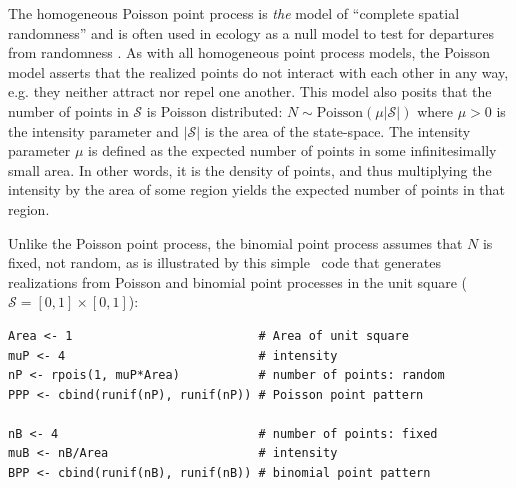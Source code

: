 The homogeneous Poisson point process is \textit{the} model of ``complete
spatial randomness'' and is often used in ecology as a null model
to test for departures from randomness
\citep{cressie:1992, diggle:2003, illian_etal:2008}.
As with all homogeneous point process models, the Poisson model
asserts that the realized points do not interact with each other in
any way, e.g. they neither attract nor repel one another.
This model also posits that the number of points in $\mathcal{S}$ is
Poisson distributed: $N \sim \text{Poisson}(\mu|\mathcal{S}|)$ where $\mu>0$ is
the intensity parameter and $|\mathcal{S}|$ is the area of the
state-space. The intensity parameter $\mu$ is defined as the expected number
of points in some infinitesimally small area. In other words, it is
the density of points, and thus multiplying the intensity by the area
of some region yields the expected number of points in that region.

Unlike the Poisson point process, the
binomial point process assumes that $N$ is fixed, not random,
as is illustrated by this simple \R~code that generates realizations
from Poisson and binomial point processes in the unit square
($\mathcal{S} = [0,1]\times[0,1]$):

\begin{samepage}
\begin{verbatim}
Area <- 1                          # Area of unit square
muP <- 4                           # intensity
nP <- rpois(1, muP*Area)           # number of points: random
PPP <- cbind(runif(nP), runif(nP)) # Poisson point pattern

nB <- 4                            # number of points: fixed
muB <- nB/Area                     # intensity
BPP <- cbind(runif(nB), runif(nB)) # binomial point pattern
\end{verbatim}
\end{samepage}

